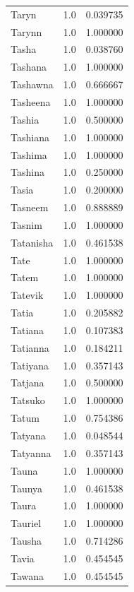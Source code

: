 \documentclass[
  letterpaper,
  DIV=11,
  numbers=noendperiod]{scrreprt}
\begin{document}
\begin{tabular}{lrr}
Taryn           &   1.0 &   0.039735 \\
Tarynn          &   1.0 &   1.000000 \\
Tasha           &   1.0 &   0.038760 \\
Tashana         &   1.0 &   1.000000 \\
Tashawna        &   1.0 &   0.666667 \\
Tasheena        &   1.0 &   1.000000 \\
Tashia          &   1.0 &   0.500000 \\
Tashiana        &   1.0 &   1.000000 \\
Tashima         &   1.0 &   1.000000 \\
Tashina         &   1.0 &   0.250000 \\
Tasia           &   1.0 &   0.200000 \\
Tasneem         &   1.0 &   0.888889 \\
Tasnim          &   1.0 &   1.000000 \\
Tatanisha       &   1.0 &   0.461538 \\
Tate            &   1.0 &   1.000000 \\
Tatem           &   1.0 &   1.000000 \\
Tatevik         &   1.0 &   1.000000 \\
Tatia           &   1.0 &   0.205882 \\
Tatiana         &   1.0 &   0.107383 \\
Tatianna        &   1.0 &   0.184211 \\
Tatiyana        &   1.0 &   0.357143 \\
Tatjana         &   1.0 &   0.500000 \\
Tatsuko         &   1.0 &   1.000000 \\
Tatum           &   1.0 &   0.754386 \\
Tatyana         &   1.0 &   0.048544 \\
Tatyanna        &   1.0 &   0.357143 \\
Tauna           &   1.0 &   1.000000 \\
Taunya          &   1.0 &   0.461538 \\
Taura           &   1.0 &   1.000000 \\
Tauriel         &   1.0 &   1.000000 \\
Tausha          &   1.0 &   0.714286 \\
Tavia           &   1.0 &   0.454545 \\
Tawana          &   1.0 &   0.454545 \\

\end{tabular}
\end{document}
